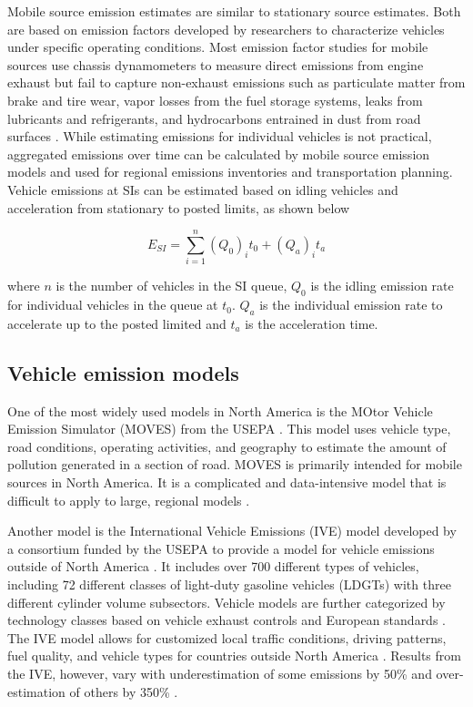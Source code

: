 Mobile source emission estimates are similar to stationary source estimates. Both are based on emission factors developed by researchers to characterize vehicles under specific operating conditions. Most emission factor studies for mobile sources use chassis dynamometers to measure direct emissions from engine exhaust but fail to capture non-exhaust emissions such as particulate matter from brake and tire wear, vapor losses from the fuel storage systems, leaks from lubricants and refrigerants, and hydrocarbons entrained in dust from road surfaces \citep{Kam2012, Franco2013}. While estimating emissions for individual vehicles is not practical, aggregated emissions over time can be calculated by mobile source emission models and used for regional emissions inventories and transportation planning. Vehicle emissions at SIs can be estimated based on idling vehicles and acceleration from stationary to posted limits, as shown below

\begin{equation}
\label{eq:siemissions}
E_{SI}=\sum_{i=1}^{n}(Q_{0})_{i}t_{0} + (Q_{a})_{i}t_{a}
\end{equation}

\noindent
where $n$ is the number of vehicles in the SI queue, $Q_{0}$ is the idling emission rate for individual vehicles in the queue at $t_{0}$.  $Q_{a}$ is the individual emission rate to accelerate up to the posted limited  and $t_{a}$ is the  acceleration time.

\subsection{Vehicle emission models} \label{sssec:VehEmissionModels}

One of the most widely used models in North America is the MOtor Vehicle Emission Simulator (MOVES) from the USEPA \citep{MOVES2014a}. This model uses vehicle type, road conditions, operating activities, and geography to estimate the amount of pollution generated in a section of road. MOVES is primarily intended for mobile sources in North America. It is a complicated and data-intensive model that is difficult to apply to large, regional models \citep{Zhang2011}.

Another model is the International Vehicle Emissions (IVE) model developed by a consortium funded by the USEPA to provide a model for vehicle emissions outside of North America \citep{IVE2008}. It includes over 700 different types of vehicles, including 72 different classes of light-duty gasoline vehicles (LDGTs) with three different cylinder volume subsectors. Vehicle models are further categorized by technology classes based on vehicle exhaust controls and European standards \citep{Davis2005}. The IVE model allows for customized local traffic conditions, driving patterns, fuel quality, and vehicle types for countries outside North America \citep{Davis2010}. Results from the IVE, however, vary with underestimation of some emissions by 50\% and over-estimation of others by 350\% \citep{Hui2007}.

